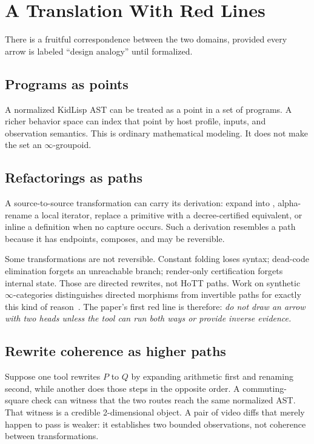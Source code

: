\documentclass[10pt,letterpaper,twocolumn]{article}
\newcommand{\code}[1]{\texttt{\detokenize{#1}}}
\begin{document}
\section{A Translation With Red Lines}
\label{sec:translation}

There is a fruitful correspondence between the two domains, provided every arrow is labeled ``design analogy'' until formalized.

\subsection{Programs as points}

A normalized KidLisp AST can be treated as a point in a set of programs. A richer behavior space can index that point by host profile, inputs, and observation semantics. This is ordinary mathematical modeling. It does not make the set an $\infty$-groupoid.

\subsection{Refactorings as paths}

A source-to-source transformation can carry its derivation: expand \code{w/2} into \code{(/ w 2)}, alpha-rename a local iterator, replace a primitive with a decree-certified equivalent, or inline a definition when no capture occurs. Such a derivation resembles a path because it has endpoints, composes, and may be reversible.

Some transformations are not reversible. Constant folding loses syntax; dead-code elimination forgets an unreachable branch; render-only certification forgets internal state. Those are directed rewrites, not HoTT paths. Work on synthetic $\infty$-categories distinguishes directed morphisms from invertible paths for exactly this kind of reason~\citep{riehl2017synthetic}. The paper's first red line is therefore: \emph{do not draw an arrow with two heads unless the tool can run both ways or provide inverse evidence.}

\subsection{Rewrite coherence as higher paths}

Suppose one tool rewrites $P$ to $Q$ by expanding arithmetic first and renaming second, while another does those steps in the opposite order. A commuting-square check can witness that the two routes reach the same normalized AST. That witness is a credible 2-dimensional object. A pair of video diffs that merely happen to pass is weaker: it establishes two bounded observations, not coherence between transformations.
\end{document}
